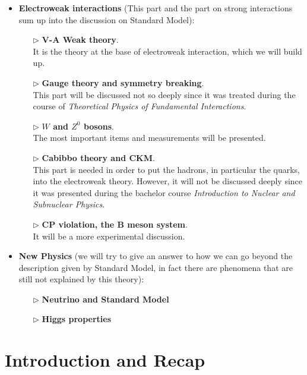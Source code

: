 \documentclass[../../main/main.tex]{subfiles}
\begin{document}
\begin{itemize}
    \item \textbf{Electroweak interactions} (This part and the part on strong interactions sum up into the discussion on Standard Model):
    \begin{itemize}
        \item[\(\triangleright\)] \textbf{V-A Weak theory}.\\
            It is the theory at the base of electroweak interaction, which we will build up.
        \item[\(\triangleright\)] \textbf{Gauge theory and symmetry breaking}.\\
            This part will be discussed not so deeply since it was treated during the course of \emph{Theoretical Physics of Fundamental Interactions}.
        \item[\(\triangleright\)] \textbf{\( W \) and \( Z^0 \) bosons}.\\
            The most important items and measurements will be presented.
        \item[\(\triangleright\)] \textbf{Cabibbo theory and CKM}.\\
            This part is needed in order to put the hadrons, in particular the quarks, into the electroweak theory. However, it will not be discussed deeply since it was presented during the bachelor course \emph{Introduction to Nuclear and Subnuclear Physics}.
        \item[\(\triangleright\)] \textbf{CP violation, the B meson system}.\\
            It will be a more experimental discussion.
    \end{itemize}

    \item \textbf{New Physics} (we will try to give an answer to how we can go beyond the description given by Standard Model, in fact there are phenomena that are still not explained by this theory):
    \begin{itemize}
        \item[\(\triangleright\)] \textbf{Neutrino and Standard Model}
        \item[\(\triangleright\)] \textbf{Higgs properties}
    \end{itemize}
\end{itemize}










\chapter{Introduction and Recap}
\end{document}
